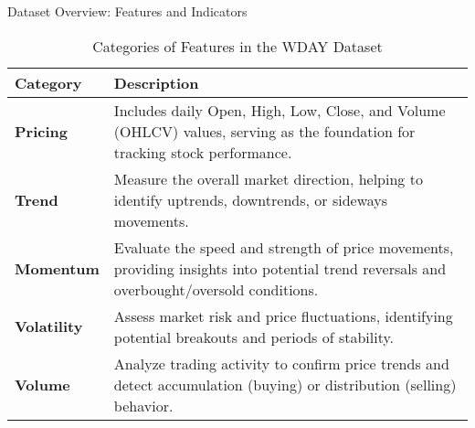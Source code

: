 \begin{frame}[label=datastructure,shrink]{Dataset Overview: Features and Indicators}
\begin{table}
\centering
\caption{Categories of Features in the WDAY Dataset}
\label{tab:datasetstructure}
\renewcommand{\arraystretch}{1.7} 
\begin{tabular}{p{2cm}p{12.5cm}}
\hline
\textbf{Category} & \textbf{Description} \\
\hline\hline
\textbf{Pricing} & Includes daily Open, High, Low, Close, and Volume (OHLCV) 
values, serving as the \alert{foundation for tracking stock performance}. \\
\textbf{Trend} & Measure the overall market direction, 
\alert{helping to identify uptrends, downtrends}, or sideways movements. \\
\textbf{Momentum} & Evaluate the \alert{speed and strength of price movements},
providing insights into potential trend reversals and overbought/oversold 
conditions. \\
\textbf{Volatility} & Assess market risk and \alert{price fluctuations}, identifying 
potential breakouts and periods of stability. \\
\textbf{Volume} & Analyze trading activity to confirm price trends and \alert{detect accumulation (buying) or distribution (selling) behavior}. \\
\hline
\end{tabular}
\end{table}

\end{frame}

